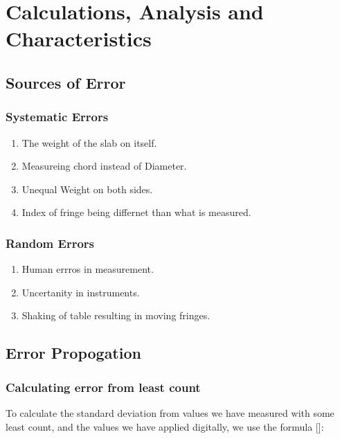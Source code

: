 \documentclass[%
sor,
jor,
 amsmath,amssymb,
 reprint,
longbibliography,
]{revtex4-2}
\begin{document}
\section{Calculations, Analysis and Characteristics}
\subsection{Sources of Error}

\noindent %
\begin{minipage}[t]{0.48\textwidth}
\subsubsection{Systematic Errors}
\begin{enumerate}
	\item The weight of the slab on itself.
	\item Measureing chord instead of Diameter.
	\item Unequal Weight on both sides. 
	\item Index of fringe being differnet than what is measured. 
\end{enumerate}
\end{minipage}
\hfill %
\begin{minipage}[t]{0.48\textwidth}
\subsubsection{Random Errors}
\begin{enumerate}
	\item Human errros in measurement.
	\item Uncertanity in instruments.
	\item Shaking of table resulting in moving fringes.
\end{enumerate}
\end{minipage}



\subsection{Error Propogation}
\subsubsection{Calculating error from least count}
To calculate the standard deviation from values we have measured with some least count, and the values we have applied digitally, we use the formula [\cite{tewari_uncertainty}]: 
\end{document}
